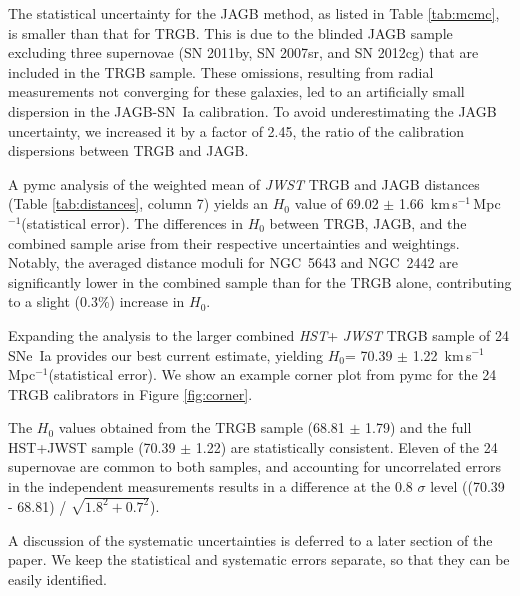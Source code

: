 \documentclass[12pt,modern]{aastex631}
\newcommand{\ho}{$H_{0}$\xspace}
\newcommand{\hounits}{\,km\,s$^{-1}$\,Mpc$^{-1}$\xspace}
\newcommand{\hst}{\emph{HST}\xspace}
\newcommand{\jwst}{\emph{JWST}\xspace}
\newcommand{\sne}{SNe~Ia\xspace}
\newcommand{\sn}{SN~Ia\xspace}
\newcommand{\ngc}{NGC\,\xspace}
\begin{document}
The statistical uncertainty for the JAGB method, as listed in Table \ref{tab:mcmc}, is smaller than that for TRGB. This is due to the blinded JAGB sample excluding three supernovae (SN 2011by, SN 2007sr, and SN 2012cg) that are included in the TRGB sample. These omissions, resulting from radial measurements not converging for these galaxies, led to an artificially small dispersion in the JAGB-\sn calibration. To avoid underestimating the JAGB uncertainty, we increased it by a factor of 2.45, the ratio of the calibration dispersions between TRGB and JAGB.

A {\ttfamily pymc} analysis of the weighted mean of \jwst TRGB and JAGB distances (Table \ref{tab:distances}, column 7) yields an \ho value of 69.02 $\pm$ 1.66 \hounits (statistical error). The differences in \ho between TRGB, JAGB, and the combined sample arise from their respective uncertainties and weightings. Notably, the averaged distance moduli for \ngc 5643 and \ngc 2442 are significantly lower in the combined sample than for the TRGB alone, contributing to a slight (0.3\%) increase in \ho.


Expanding the analysis to the larger combined \hst + \jwst TRGB sample of 24 \sne provides our best current estimate, yielding \ho =  70.39  $\pm$ 1.22 \hounits (statistical error).  We show an example corner plot from  {\ttfamily pymc} for the 24 TRGB calibrators in Figure \ref{fig:corner}. 

The \ho values obtained from the TRGB sample (68.81 $\pm$  1.79) and the full HST+JWST sample (70.39 $\pm$ 1.22) are statistically consistent. Eleven of the 24 supernovae are common to both samples, and accounting for uncorrelated errors in the independent measurements results in a difference at the 0.8 $\sigma$ level ((70.39 - 68.81) / $\sqrt{1.8^2 + 0.7^2}$).

A discussion of the systematic uncertainties is deferred to a later section of the paper.
We  keep the statistical and systematic errors separate,  so that they can be easily identified.    
\end{document}
